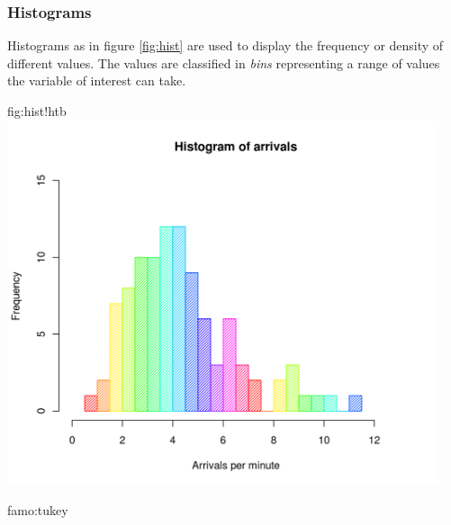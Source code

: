 	\subsubsection{Histograms}
		Histograms as in figure \ref{fig:hist} are used to display the frequency or density of different values. The values are classified in \emph{bins} representing a range of values the variable of interest can take.			
		\begin{fig}[Histogram]{fig:hist}{!htb}
			\centering
			\includegraphics[width=0.95\textwidth,trim={0 1cm 0 5cm},clip]{P02hist.png}
		\end{fig}
\begin{famo}{famo:tukey}
	
\end{famo}				

